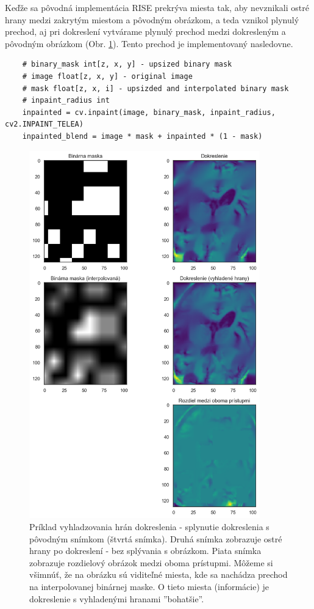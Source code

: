 Keďže sa pôvodná implementácia RISE prekrýva miesta tak, aby nevznikali ostré hrany medzi zakrytým miestom a pôvodným obrázkom, a teda vznikol plynulý prechod, aj pri dokreslení vytvárame plynulý prechod medzi dokresleným a pôvodným obrázkom (Obr. \ref{fig:inpaint_soft_corners}). Tento prechod je implementovaný nasledovne.

\begin{lstlisting}
    # binary_mask int[z, x, y] - upsized binary mask
    # image float[z, x, y] - original image
    # mask float[z, x, i] - upsizded and interpolated binary mask
    # inpaint_radius int
    inpainted = cv.inpaint(image, binary_mask, inpaint_radius, cv2.INPAINT_TELEA)
    inpainted_blend = image * mask + inpainted * (1 - mask)
\end{lstlisting}

\begin{figure}[H]
    \centering
    \includegraphics[width=10cm]{assets/images/inpaint_soft_corners.png}
    \caption{Príklad vyhladzovania hrán dokreslenia - splynutie dokreslenia s pôvodným snímkom (štvrtá snímka). Druhá snímka zobrazuje ostré hrany po dokreslení - bez splývania s obrázkom. Piata snímka zobrazuje rozdielový obrázok medzi oboma prístupmi. Môžeme si všimnúť, že na obrázku sú viditeľné miesta, kde sa nachádza prechod na interpolovanej binárnej maske. O tieto miesta (informácie) je dokreslenie s vyhladenými hranami ''bohatšie''.}
    \label{fig:inpaint_soft_corners}
\end{figure}

